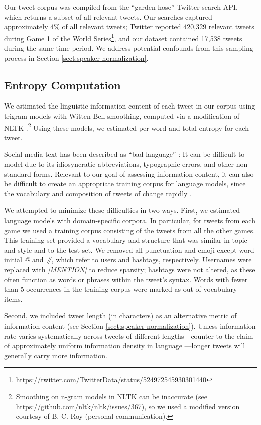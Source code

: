 \documentclass[11pt,letterpaper]{article}
\begin{document}
Our tweet corpus was compiled from the ``garden-hose'' Twitter search API, which returns a subset of all relevant tweets. Our searches captured approximately 4\% of all relevant tweets; Twitter reported 420,329 relevant tweets during Game 1 of the World Series\footnote{\url{https://twitter.com/TwitterData/status/524972545930301440}}, and our dataset contained 17,538 tweets during the same time period.  We address potential confounds from this sampling process in Section \ref{sect:speaker-normalization}.

\subsection{Entropy Computation}

We estimated the linguistic information content of each tweet in our corpus using trigram models with Witten-Bell smoothing, computed via a modification of NLTK \cite{bird2006}.\footnote{Smoothing on n-gram models in NLTK can be inaccurate (see \url{https://github.com/nltk/nltk/issues/367}), so we used a modified version courtesy of B. C. Roy (personal communication).} Using these models, we estimated per-word and total entropy for each tweet.

Social media text has been described as ``bad language'' \cite{eisenstein2013}: It can be difficult to model due to its idiosyncratic abbreviations, typographic errors, and other non-standard forms. Relevant to our goal of assessing information content, it can also be difficult to create an appropriate training corpus for language models, since the vocabulary and composition of tweets of change rapidly \cite{eisenstein2013}.

We attempted to minimize these difficulties in two ways.  First, we estimated language models with domain-specific corpora. In particular, for tweets from each game we used a training corpus consisting of the tweets from all the other games. This training set provided a vocabulary and structure that was similar in topic and style and to the test set.  We removed all punctuation and emoji except word-initial {\it @} and {\it \#}, which refer to users and hashtags, respectively.  Usernames were replaced with {\it [MENTION]} to reduce sparsity; hashtags were not altered, as these often function as words or phrases within the tweet's syntax.  Words with fewer than 5 occurrences in the training corpus were marked as out-of-vocabulary items. 

Second, we included tweet length (in characters) as an alternative metric of information content (see Section \ref{sect:speaker-normalization}). Unless information rate varies systematically across tweets of different lengths---counter to the claim of approximately uniform information density in language \cite{genzel2002,levy2007}---longer tweets will generally carry more information. 
\end{document}
